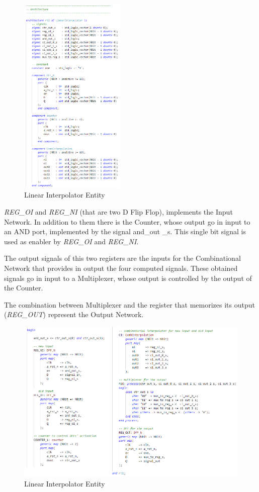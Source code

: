 \begin{figure}[H]
    \centering
    \includegraphics[width=0.45\textwidth]{img/Chapter3/LinearInterpolator-architecture1.png}
    \caption{Linear Interpolator Entity}
    \label{fig:LIA1}
\end{figure}

\textit{REG\_OI} and \textit{REG\_NI} (that are two D Flip Flop), implements the Input Network. In addition to them there is the Counter, whose output go in input to an AND port, implemented by the signal and\_out  \_s. This single bit signal is used as enabler by \textit{REG\_OI} and \textit{REG\_NI}.

The output signals of this two registers are the inputs for the Combinational Network that provides in output the four computed signals. These obtained signals go in input to a Multiplexer, whose output is controlled by the output of the Counter.

The combination between Multiplexer and the register that memorizes its output (\textit{REG\_OUT}) represent the Output Network.

\begin{figure}[H]
    \centering
    \includegraphics[width=1\textwidth]{img/Chapter3/LinearInterpolator-architecture2.png}
    \caption{Linear Interpolator Entity}
    \label{fig:LIA2}
\end{figure}